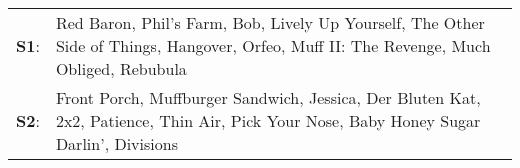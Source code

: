 \begin{supertabular}{p{0.03\textwidth}p{0.92\textwidth}}
 \textbf{S1}:  &  Red Baron\textsuperscript{}, \enspace Phil's Farm\textsuperscript{}, \enspace Bob\textsuperscript{}, \enspace Lively Up Yourself\textsuperscript{}, \enspace The Other Side of Things\textsuperscript{}, \enspace Hangover\textsuperscript{}, \enspace Orfeo\textsuperscript{}, \enspace Muff II: The Revenge\textsuperscript{}, \enspace Much Obliged\textsuperscript{}, \enspace Rebubula\textsuperscript{}  \enspace  \\
 \textbf{S2}:  &   Front Porch\textsuperscript{}, \enspace Muffburger Sandwich\textsuperscript{}, \enspace Jessica\textsuperscript{}, \enspace Der Bluten Kat\textsuperscript{}, \enspace 2x2\textsuperscript{}, \enspace Patience\textsuperscript{}, \enspace Thin Air\textsuperscript{}, \enspace Pick Your Nose\textsuperscript{}, \enspace Baby Honey Sugar Darlin'\textsuperscript{}, \enspace Divisions\textsuperscript{}  \enspace  \\
\end{supertabular}

